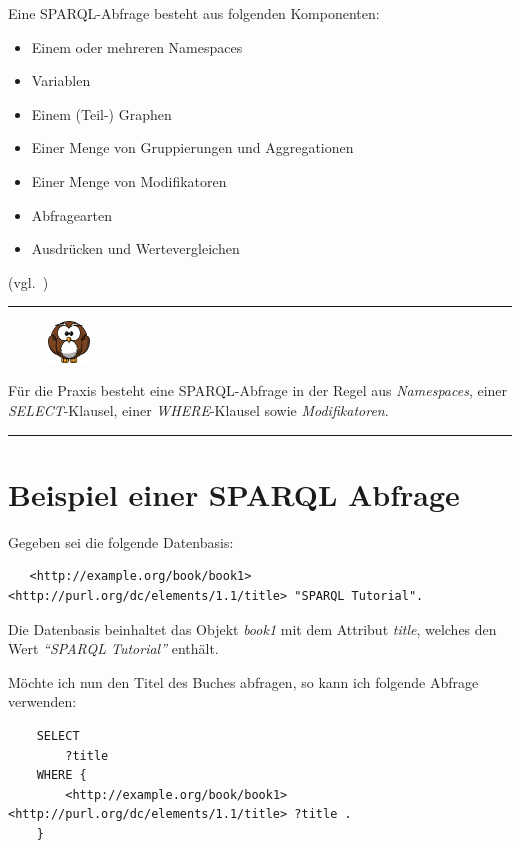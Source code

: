 Eine SPARQL-Abfrage besteht aus folgenden Komponenten:
\begin{itemize}
    \item Einem oder mehreren Namespaces
    \item Variablen
    \item Einem (Teil-) Graphen
    \item Einer Menge von Gruppierungen und Aggregationen
    \item Einer Menge von Modifikatoren
    \item Abfragearten
    \item Ausdrücken und Wertevergleichen
\end{itemize}
(vgl.~\cite[18.1.10 SPARQL Query]{w3sparql_querylang})

\noindent\rule[1ex]{\textwidth}{1pt}
\begin{figure}
    \vspace{-19pt}
    \includegraphics[width=0.1\textwidth]{bilder/owl.png}
\end{figure}
Für die Praxis besteht eine SPARQL-Abfrage in der Regel aus \textit{Namespaces}, einer \textit{SELECT}-Klausel, einer \textit{WHERE}-Klausel sowie \textit{Modifikatoren}.\\

\noindent\rule[1ex]{\textwidth}{1pt}

\section{Beispiel einer SPARQL Abfrage}
\label{sec:sparql_beispiel}

Gegeben sei die folgende Datenbasis:
\begin{lstlisting}
   <http://example.org/book/book1> <http://purl.org/dc/elements/1.1/title> "SPARQL Tutorial".
\end{lstlisting}

Die Datenbasis beinhaltet das Objekt \textit{book1} mit dem Attribut \textit{title}, welches den Wert \textit{``SPARQL Tutorial''} enthält.

Möchte ich nun den Titel des Buches abfragen, so kann ich folgende Abfrage verwenden:
\begin{lstlisting}
    SELECT
        ?title
    WHERE {
        <http://example.org/book/book1> <http://purl.org/dc/elements/1.1/title> ?title .
    }
\end{lstlisting}

